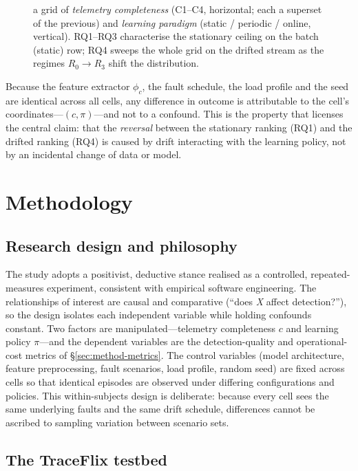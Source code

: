 \documentclass[acmsmall]{acmart}
\begin{document}
\begin{figure}[t]
{a grid of \emph{telemetry completeness} (C1--C4, horizontal; each a superset of the
previous) and \emph{learning paradigm} (static / periodic / online, vertical).
RQ1--RQ3 characterise the stationary ceiling on the batch (static) row; RQ4 sweeps
the whole grid on the drifted stream as the regimes $R_0\!\rightarrow\!R_3$ shift the
distribution.}\label{fig:design}
\end{figure} Because the feature extractor $\phi_c$, the fault schedule, the load profile and the seed are identical across all cells, any difference in outcome is attributable to the cell's coordinates---$(c, \pi)$---and not to a confound. This is the property that licenses the central claim: that the \emph{reversal} between the stationary ranking (RQ1) and the drifted ranking (RQ4) is caused by drift interacting with the learning policy, not by an incidental change of data or model.

\section{Methodology}\label{sec:method}

\subsection{Research design and philosophy}\label{sec:method-design}

The study adopts a positivist, deductive stance realised as a controlled, repeated-measures experiment, consistent with empirical software engineering. The relationships of interest are causal and comparative (``does \emph{X} affect detection?''), so the design isolates each independent variable while holding confounds constant. Two factors are manipulated---telemetry completeness $c$ and learning policy $\pi$---and the dependent variables are the detection-quality and operational-cost metrics of \S\ref{sec:method-metrics}. The control variables (model architecture, feature preprocessing, fault scenarios, load profile, random seed) are fixed across cells so that identical episodes are observed under differing configurations and policies. This within-subjects design is deliberate: because every cell sees the same underlying faults and the same drift schedule, differences cannot be ascribed to sampling variation between scenario sets.

\subsection{The TraceFlix testbed}\label{sec:method-testbed}
\end{document}
